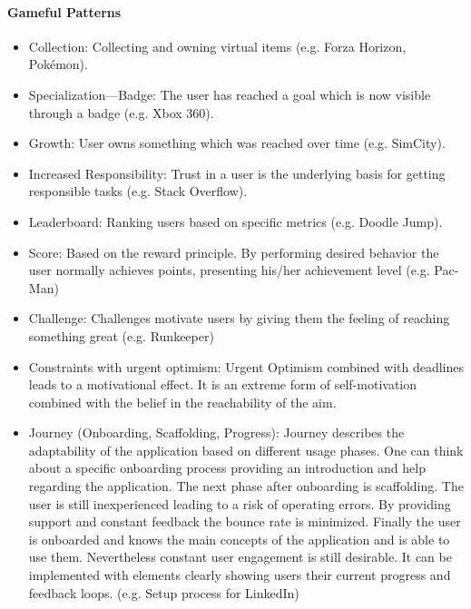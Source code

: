 \paragraph*{Gameful Patterns}
\label{GamefulPatterns}
\begin{itemize}
	\item Collection: Collecting and owning virtual items (e.g. Forza Horizon, Pokémon). \cite[p. 4, 35]{lewisIrresistibleAppsMotivational2014}
	\item Specialization—Badge: The user has reached a goal which is now visible through a badge (e.g. Xbox 360). \cite[p. 4, 37]{lewisIrresistibleAppsMotivational2014}
	\item Growth: User owns something which was reached over time (e.g. SimCity). \cite[p. 4, 40]{lewisIrresistibleAppsMotivational2014}
	\item Increased Responsibility: Trust in a user is the underlying basis for getting responsible tasks (e.g. Stack Overflow). \cite[p. 4, 41]{lewisIrresistibleAppsMotivational2014}
	\item Leaderboard: Ranking users based on specific metrics (e.g. Doodle Jump). \cite[p. 4, 44]{lewisIrresistibleAppsMotivational2014}
	\item Score: Based on the reward principle. By performing desired behavior the user normally achieves points, presenting his/her achievement level (e.g. Pac-Man) \cite[p. 4, 46]{lewisIrresistibleAppsMotivational2014}
	\item Challenge: Challenges motivate users by giving them the feeling of reaching something great (e.g. Runkeeper) \cite[p. 77, 78]{kumarGamificationWorkDesigning2013}
	\item Constraints with urgent optimism: Urgent Optimism combined with deadlines leads to a motivational effect. It is an extreme form of self-motivation combined with the belief in the reachability of the aim. \cite[p. 78]{kumarGamificationWorkDesigning2013}
	\item Journey (Onboarding, Scaffolding, Progress): Journey describes the adaptability of the application based on different usage phases. One can think about a specific onboarding process providing an introduction and help regarding the application. The next phase after onboarding is scaffolding. The user is still inexperienced leading to a risk of operating errors. By providing support and constant feedback the bounce rate is minimized. Finally the user is onboarded and knows the main concepts of the application and is able to use them. Nevertheless constant user engagement is still desirable. It can be implemented with elements clearly showing users their current progress and feedback loops. (e.g. Setup process for LinkedIn) \cite[p. 80, 81, 82]{kumarGamificationWorkDesigning2013}
\end{itemize}

